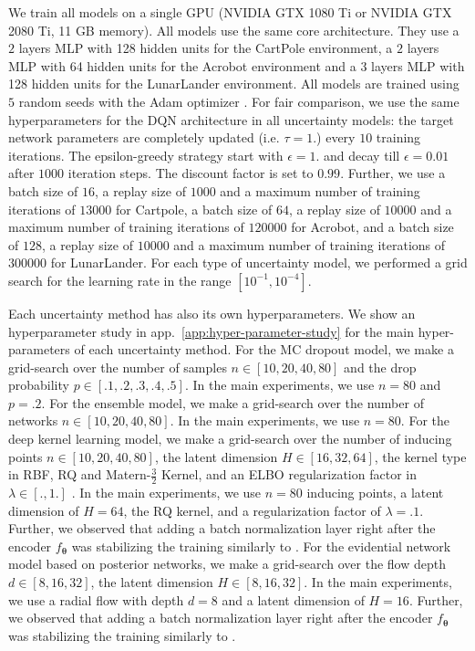 We train all models on a single GPU (NVIDIA GTX 1080 Ti or NVIDIA GTX 2080 Ti, 11 GB memory). All models use the same core architecture. They use a $2$ layers MLP with 128 hidden units for the CartPole environment, a $2$ layers MLP with 64 hidden units for the Acrobot environment and a $3$ layers MLP with 128 hidden units for the LunarLander environment. All models are trained using $5$ random seeds with the Adam optimizer \cite{adam-optimizer}. For fair comparison, we use the same hyperparameters for the DQN architecture in all uncertainty models: the target network parameters are completely updated (i.e. $\tau=1.$) every $10$ training iterations. The epsilon-greedy strategy start with $\epsilon=1.$ and decay till $\epsilon=0.01$ after $1000$ iteration steps. The discount factor is set to $0.99$. Further, we use a batch size of $16$, a replay size of $1000$ and a maximum number of training iterations of $13000$ for Cartpole, a batch size of $64$, a replay size of $10000$ and a maximum number of training iterations of $120000$ for Acrobot, and a batch size of $128$, a replay size of $10000$ and a maximum number of training iterations of $300000$ for LunarLander. For each type of uncertainty model, we performed a grid search for the learning rate in the range $[10^{-1}, 10^{-4}]$. 

Each uncertainty method has also its own hyperparameters. We show an hyperparameter study in app.~\ref{app:hyper-parameter-study} for the main hyper-parameters of each uncertainty method. For the MC dropout model, we make a grid-search over the number of samples $n \in [10, 20, 40, 80]$ and the drop probability $p \in [.1, .2, .3, .4, .5]$. In the main experiments, we use $n=80$ and $p=.2$. For the ensemble model, we make a grid-search over the number of networks $n \in [10, 20, 40, 80]$. In the main experiments, we use $n=80$. For the deep kernel learning model, we make a grid-search over the number of inducing points $n \in [10, 20, 40, 80]$, the latent dimension $H \in [16, 32, 64]$, the kernel type in RBF, RQ and Matern-$\frac{3}{2}$ Kernel, and an ELBO regularization factor in $\lambda \in [., 1.]$ . In the main experiments, we use $n=80$ inducing points, a latent dimension of $H=64$, the RQ kernel, and a regularization factor of $\lambda=.1$. Further, we observed that adding a batch normalization layer right after the encoder $f_{\bm{\theta}}$ was stabilizing the training similarly to \citet{postnet}. For the evidential network model based on posterior networks, we make a grid-search over the flow depth $d \in [8, 16, 32]$, the latent dimension $H \in [8, 16, 32]$. In the main experiments, we use a radial flow with depth $d=8$ and a latent dimension of $H=16$. Further, we observed that adding a batch normalization layer right after the encoder $f_{\bm{\theta}}$ was stabilizing the training similarly to \citet{postnet}.

